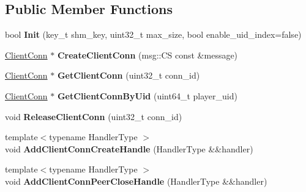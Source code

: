 \subsection*{Public Member Functions}
\begin{DoxyCompactItemize}
\item 
\hypertarget{classClientConnManager_a29d957a4abb46f502d9814b24de5a1fd}{
bool {\bfseries Init} (key\_\-t shm\_\-key, uint32\_\-t max\_\-size, bool enable\_\-uid\_\-index=false)}
\label{classClientConnManager_a29d957a4abb46f502d9814b24de5a1fd}

\item 
\hypertarget{classClientConnManager_a6a5bccb8465b8c15686c4938ac11f909}{
\hyperlink{classClientConn}{ClientConn} $\ast$ {\bfseries CreateClientConn} (msg::CS const \&message)}
\label{classClientConnManager_a6a5bccb8465b8c15686c4938ac11f909}

\item 
\hypertarget{classClientConnManager_a580924fcff69ed74128c0e52a892cb2e}{
\hyperlink{classClientConn}{ClientConn} $\ast$ {\bfseries GetClientConn} (uint32\_\-t conn\_\-id)}
\label{classClientConnManager_a580924fcff69ed74128c0e52a892cb2e}

\item 
\hypertarget{classClientConnManager_a85e304aa0361685d08c0f062943c2904}{
\hyperlink{classClientConn}{ClientConn} $\ast$ {\bfseries GetClientConnByUid} (uint64\_\-t player\_\-uid)}
\label{classClientConnManager_a85e304aa0361685d08c0f062943c2904}

\item 
\hypertarget{classClientConnManager_a030d7978ebc156b1198aa4f5664130f3}{
void {\bfseries ReleaseClientConn} (uint32\_\-t conn\_\-id)}
\label{classClientConnManager_a030d7978ebc156b1198aa4f5664130f3}

\item 
\hypertarget{classClientConnManager_a77d0dc9d48f04c7590c39748a325a551}{
{\footnotesize template$<$typename HandlerType $>$ }\\void {\bfseries AddClientConnCreateHandle} (HandlerType \&\&handler)}
\label{classClientConnManager_a77d0dc9d48f04c7590c39748a325a551}

\item 
\hypertarget{classClientConnManager_a16d2b239dba44657b839d91c03b0898e}{
{\footnotesize template$<$typename HandlerType $>$ }\\void {\bfseries AddClientConnPeerCloseHandle} (HandlerType \&\&handler)}
\label{classClientConnManager_a16d2b239dba44657b839d91c03b0898e}

\end{DoxyCompactItemize}
